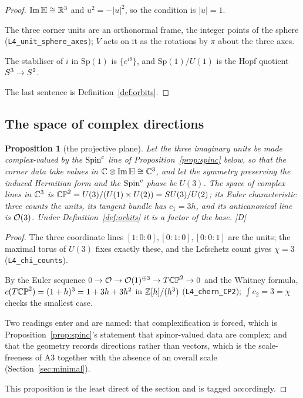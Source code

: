 \documentclass[11pt,a4paper]{article}
\theoremstyle{plain}
\newtheorem{proposition}[theorem]{Proposition}
\theoremstyle{definition}
\theoremstyle{remark}
\newcommand{\Hquat}{\mathbb{H}}
\newcommand{\ImH}{\operatorname{Im}\Hquat}
\newcommand{\rigD}{[\textup{D}]}
\begin{document}
\begin{proof}
$\ImH\cong\R^{3}$ and $u^{2}=-\lvert u\rvert^{2}$, so the condition is $\lvert u\rvert=1$.

The three corner units are an orthonormal frame, the integer points of the sphere (\texttt{L4\_unit\_sphere\_axes}); $V$ acts on it as the rotations by $\pi$ about the three axes.

The stabiliser of $i$ in $\mathrm{Sp}(1)$ is $\{e^{i\theta}\}$, and $\mathrm{Sp}(1)/U(1)$ is the Hopf quotient $S^{3}\to S^2$.

The last sentence is Definition~\ref{def:orbits}.
\end{proof}

\subsection{The space of complex directions}

\begin{proposition}[the projective plane]\label{prop:CP2}
Let the three imaginary units be made complex-valued by the $\text{Spin}^c$ line of Proposition~\ref{prop:spinc} below, so that the corner data take values in $\C\otimes\ImH\cong\C^{3}$, and let the symmetry preserving the induced Hermitian form and the $\text{Spin}^c$ phase be $U(3)$. The space of complex lines in $\mathbb{C}^{3}$ is $\mathbb{CP}^2=U(3)/(U(1)\times U(2))=SU(3)/U(2)$; its Euler characteristic three counts the units, its tangent bundle has $c_{1}=3h$, and its anticanonical line is $\mathcal{O}(3)$. Under Definition~\ref{def:orbits} it is a factor of the base. \rigD
\end{proposition}

\begin{proof}
The three coordinate lines $[1{:}0{:}0],[0{:}1{:}0],[0{:}0{:}1]$ are the units; the maximal torus of $U(3)$ fixes exactly these, and the Lefschetz count gives $\chi=3$ (\texttt{L4\_chi\_counts}).

By the Euler sequence $0\to\mathcal{O}\to\mathcal{O}(1)^{\oplus3}\to T\mathbb{CP}^2\to0$ and the Whitney formula, $c(T\mathbb{CP}^2)=(1+h)^{3}=1+3h+3h^{2}$ in $\mathbb{Z}[h]/(h^{3})$ \cite{GriffithsHarris} (\texttt{L4\_chern\_CP2}); $\int c_{2}=3=\chi$ checks the smallest case.

Two readings enter and are named: that complexification is forced, which is Proposition~\ref{prop:spinc}'s statement that spinor-valued data are complex; and that the geometry records directions rather than vectors, which is the scale-freeness of A3 together with the absence of an overall scale (Section~\ref{sec:minimal}).

This proposition is the least direct of the section and is tagged accordingly.
\end{proof}
\end{document}
